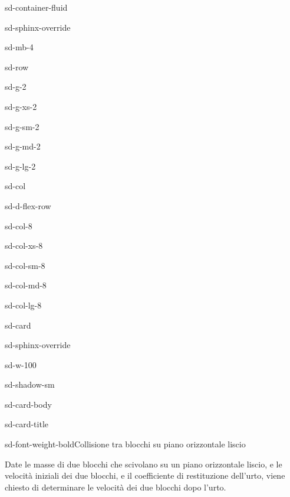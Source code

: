 \documentclass[letterpaper,10pt,italian]{jupyterBook}
\begin{document}
\begin{sphinxuseclass}{sd-container-fluid}
\begin{sphinxuseclass}{sd-sphinx-override}
\begin{sphinxuseclass}{sd-mb-4}
\begin{sphinxuseclass}{sd-row}
\begin{sphinxuseclass}{sd-g-2}
\begin{sphinxuseclass}{sd-g-xs-2}
\begin{sphinxuseclass}{sd-g-sm-2}
\begin{sphinxuseclass}{sd-g-md-2}
\begin{sphinxuseclass}{sd-g-lg-2}
\begin{sphinxuseclass}{sd-col}
\begin{sphinxuseclass}{sd-d-flex-row}
\begin{sphinxuseclass}{sd-col-8}
\begin{sphinxuseclass}{sd-col-xs-8}
\begin{sphinxuseclass}{sd-col-sm-8}
\begin{sphinxuseclass}{sd-col-md-8}
\begin{sphinxuseclass}{sd-col-lg-8}
\begin{sphinxuseclass}{sd-card}
\begin{sphinxuseclass}{sd-sphinx-override}
\begin{sphinxuseclass}{sd-w-100}
\begin{sphinxuseclass}{sd-shadow-sm}
\begin{sphinxuseclass}{sd-card-body}
\begin{sphinxuseclass}{sd-card-title}
\begin{sphinxuseclass}{sd-font-weight-bold}Collisione tra blocchi su piano orizzontale liscio
\end{sphinxuseclass}
\end{sphinxuseclass}
\sphinxAtStartPar
Date le masse di due blocchi che scivolano su un piano orizzontale liscio, e le velocità iniziali dei due blocchi, e il coefficiente di restituzione dell’urto, viene chiesto di determinare le velocità dei due blocchi dopo l’urto.


\end{sphinxuseclass}
\end{sphinxuseclass}
\end{sphinxuseclass}
\end{sphinxuseclass}
\end{sphinxuseclass}
\end{sphinxuseclass}
\end{sphinxuseclass}
\end{sphinxuseclass}
\end{sphinxuseclass}
\end{sphinxuseclass}
\end{sphinxuseclass}
\end{sphinxuseclass}
\end{sphinxuseclass}
\end{sphinxuseclass}
\end{sphinxuseclass}
\end{sphinxuseclass}
\end{sphinxuseclass}
\end{sphinxuseclass}
\end{sphinxuseclass}
\end{sphinxuseclass}
\end{sphinxuseclass}
\end{document}
